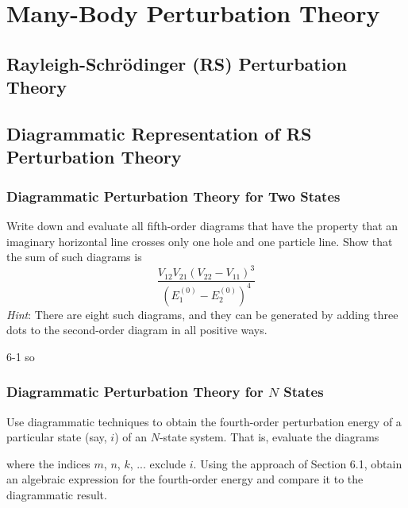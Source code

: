 \documentclass[a4paper]{book}
\begin{document}

	\chapter{Many-Body Perturbation Theory}
	
	\section{Rayleigh-Schr{\"o}dinger (RS) Perturbation Theory}
	
	\section{Diagrammatic Representation of RS Perturbation Theory}
	
	\subsection{Diagrammatic Perturbation Theory for Two States}
	
	\begin{exercise}
	Write down and evaluate all fifth-order diagrams that have the property that an imaginary horizontal line crosses only one hole and one particle line. Show that the sum of such diagrams is
	\[
		\frac{V_{12}V_{21}(V_{22}-V_{11})^3}{(E^{(0)}_1 - E^{(0)}_2)^4}
	\]
	{\it Hint}: There are eight such diagrams, and they can be generated by adding three dots to the second-order diagram in all positive ways.
	\end{exercise}
	
	\begin{solution}
		6-1 so
	\end{solution}
	
	\subsection{Diagrammatic Perturbation Theory for \texorpdfstring{$N$}- States}
	
	\begin{exercise}
	Use diagrammatic techniques to obtain the fourth-order perturbation energy of a particular state (say, $i$) of an $N$-state system. That is, evaluate the diagrams
	
	
	where the indices $m$, $n$, $k$, ... exclude $i$. Using the approach of Section 6.1, obtain an algebraic expression for the fourth-order energy and compare it to the diagrammatic result.
	
	\end{exercise}
	
\end{document}
